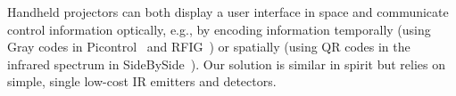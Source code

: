 Handheld projectors can both display a user interface in space and communicate control information optically, e.g., by encoding information temporally (using Gray codes in Picontrol~\cite{schmidt_picontrol:_2012} and RFIG~\cite{raskar_rfig_2004}) or spatially (using QR codes in the infrared spectrum in SideBySide~\cite{willis_sidebyside:_2011}). Our solution is similar in spirit but relies on simple, single low-cost IR emitters and detectors. 

